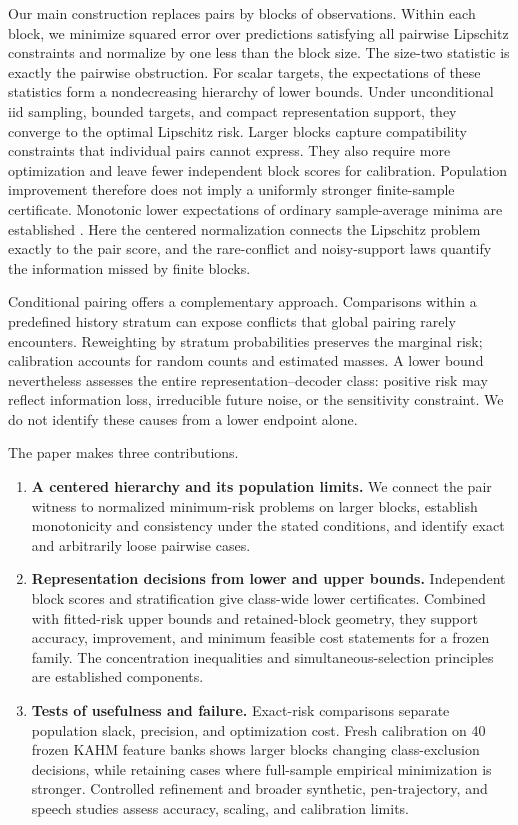 Our main construction replaces pairs by blocks of observations. Within each
block, we minimize squared error over predictions satisfying all pairwise
Lipschitz constraints and normalize by one less than the block size. The
size-two statistic is exactly the pairwise obstruction. For scalar targets,
the expectations of these statistics form a nondecreasing hierarchy of lower
bounds. Under unconditional iid sampling, bounded targets, and compact
representation support, they converge to the optimal Lipschitz risk. Larger blocks capture compatibility constraints that
individual pairs cannot express. They also require more optimization and
leave fewer independent block scores for calibration. Population improvement
therefore does not imply a uniformly stronger finite-sample certificate.
Monotonic lower expectations of ordinary sample-average minima are established
\citep{mak1999montecarlo}. Here the centered normalization connects the
Lipschitz problem exactly to the pair score, and the rare-conflict and
noisy-support laws quantify the information missed by finite blocks.

Conditional pairing offers a complementary approach. Comparisons within a
predefined history stratum can expose conflicts that global pairing rarely
encounters. Reweighting by stratum probabilities preserves the marginal risk;
calibration accounts for random counts and estimated masses. A lower bound
nevertheless assesses the entire representation--decoder class: positive risk
may reflect information loss, irreducible future noise, or the sensitivity
constraint. We do not identify these causes from a lower endpoint alone.

The paper makes three contributions.
\begin{enumerate}[leftmargin=*,itemsep=2pt]
\item \textbf{A centered hierarchy and its population limits.} We connect the pair
witness to normalized minimum-risk problems on larger blocks, establish
monotonicity and consistency under the stated conditions, and identify exact
and arbitrarily loose pairwise cases.
\item \textbf{Representation decisions from lower and upper bounds.}
Independent block scores and stratification give class-wide lower
certificates. Combined with fitted-risk upper bounds and retained-block
geometry, they support accuracy, improvement, and minimum feasible cost
statements for a frozen family. The concentration inequalities and
simultaneous-selection principles are established components.
\item \textbf{Tests of usefulness and failure.} Exact-risk comparisons separate
population slack, precision, and optimization cost. Fresh calibration on 40
frozen KAHM feature banks shows larger blocks changing class-exclusion
decisions, while retaining cases where full-sample empirical minimization is
stronger. Controlled refinement and broader synthetic, pen-trajectory, and
speech studies assess accuracy, scaling, and calibration limits.
\end{enumerate}

